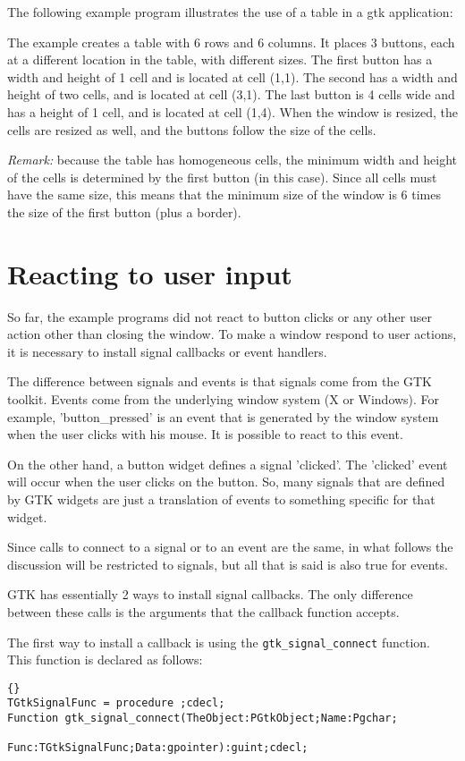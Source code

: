 \documentclass[10pt]{article}
\begin{document}
The following example program illustrates the use of a table in a gtk
application:

The example creates a table with 6 rows and 6 columns. It places 3 buttons, 
each at a different location in the table, with different sizes. The first
button has a width and height of 1 cell and is located at cell (1,1). The 
second has a width and height of two cells, and is located at cell (3,1).
The last button is 4 cells wide and has a height of 1 cell, and is located
at cell (1,4). When the window is resized, the cells are resized as well,
and the buttons follow the size of the cells.

{\em Remark:} because the table has homogeneous cells, the minimum width 
and height of the cells is determined by the first button (in this case). 
Since all cells must have the same size, this means that the minimum size 
of the window is 6 times the size of the first button (plus a border).

\section{Reacting to user input}
So far, the example programs did not react to button clicks or any other user
action other than closing the window. To make a window respond to user
actions, it is necessary to install signal callbacks or event handlers.

The difference between signals and events is that signals come from the GTK
toolkit. Events come from the underlying window system (X or Windows).
For example, 'button\_pressed' is an event that is generated by the window
system when the user clicks with his mouse. It is possible to react to 
this event. 

On the other hand, a button widget defines a signal 'clicked'. 
The 'clicked' event will occur when the user clicks on the button. 
So, many signals that are defined by GTK widgets are just a translation 
of events to something specific for that widget.

Since calls to connect to a signal or to an event are the same, in what
follows the discussion will be restricted to signals, but all that is 
said is also true for events.

GTK has essentially 2 ways to install signal callbacks. The only difference
between these calls is the arguments that the callback function accepts.

The first way to install a callback is using the
\lstinline|gtk_signal_connect| function. This function is declared as
follows:
\begin{lstlisting}{}
TGtkSignalFunc = procedure ;cdecl;
Function gtk_signal_connect(TheObject:PGtkObject;Name:Pgchar;
                            Func:TGtkSignalFunc;Data:gpointer):guint;cdecl;
\end{lstlisting}
\end{document}
